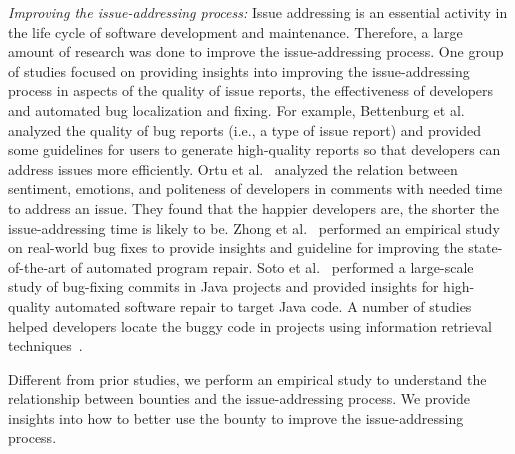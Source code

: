 \textit{Improving the issue-addressing process:}
Issue addressing is an essential activity in the life cycle of software development and maintenance. Therefore, a large amount of research was done to improve the issue-addressing process.
One group of studies focused on providing insights into improving the issue-addressing process in aspects of the quality of issue reports, the effectiveness of developers and automated bug localization and fixing.
For example, Bettenburg et al.~\cite{bettenburg2008makes,hooimeijer2007modeling} analyzed the quality of bug reports (i.e., a type of issue report) and provided some guidelines for users to generate high-quality reports so that developers can address issues more efficiently. Ortu et al.~\cite{Ortu:2015} analyzed the relation between sentiment, emotions, and politeness of developers in comments with needed time to address an issue. They found that the happier developers are, the shorter the issue-addressing time is likely to be. Zhong et al.~\cite{Zhong:2015} performed an empirical study on real-world bug fixes to provide insights and guideline for improving the state-of-the-art of automated program repair. Soto et al.~\cite{Soto:2016} performed a large-scale study of bug-fixing commits in Java projects and provided insights for high-quality automated software repair to target Java code.
A number of studies helped developers locate the buggy code in projects using information retrieval techniques~\cite{Zhou:2012,Saha:2013,WangL16,WangLL14}.
\begin{comment}

Another group of studies focused on developing automated tools to facilitate the issue-addressing process. \cite{Zhou:2012,Saha:2013,WangL16,WangLL14} leveraged textual and structural information in a bug report to help developers locate the buggy code in projects using information retrieval techniques. \cite{Lam:2015,XiaoKMB17} leveraged deep learning techniques to facilitate the bug localization task.
\cite{anvik2006should} invented an SVM-based approach to semi-automatically assign bug reports to developers. \cite{hosseini2012market} improved bug assignment mechanism with a market-based approach to speed up the bug-fixing process. \cite{XuanJHRZLW15,hu2014effective,goyal2017effective} proposed an approach to recommend suitable developers to fix bugs.

\end{comment}
Different from prior studies, we perform an empirical study to understand the relationship between bounties and the issue-addressing process. We provide insights into how to better use the bounty to improve the issue-addressing process.



